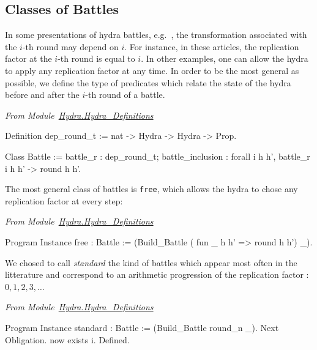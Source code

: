 \subsection{Classes of Battles}
\label{sect:battle-classes}

In some presentations of hydra battles, e.g.~\cite{KP82, bauer2008}, the transformation associated with the $i$-th round may depend on $i$. For instance, in these articles, the replication factor at the $i$-th round is equal to $i$. In other examples, one can allow the hydra to apply any replication factor at any time. In order to be the most general as possible, we define the type of predicates which relate the state of the hydra before and after the $i$-th round of a battle.

\vspace{4pt}
\emph{From Module~\href{../theories/html/hydras.Hydra.Hydra_Definitions.html}{Hydra.Hydra\_Definitions}}
\label{types:Battle}

\begin{Coqsrc}
Definition dep_round_t := nat -> Hydra -> Hydra -> Prop.

Class Battle :=  {battle_r : dep_round_t;
                  battle_inclusion : forall i h h',
                      battle_r i h h' -> round h h'}.

\end{Coqsrc}

The most general class of battles is \texttt{free}, which allows the hydra to chose any replication factor at every step:

\vspace{4pt}
\emph{From Module~\href{../theories/html/hydras.Hydra.Hydra_Definitions.html\#free}{Hydra.Hydra\_Definitions}}

\begin{Coqsrc}
Program Instance free : Battle :=
  (Build_Battle ( fun _  h h' => round h h') _).
\end{Coqsrc}

We chosed to call \emph{standard} the kind of battles which appear  most often in the litterature and correspond to an arithmetic progression of the replication factor : $0,1,2,3, \dots$

\vspace{4pt}
\emph{From Module~\href{../theories/html/hydras.Hydra.Hydra_Definitions.html\#standard}{Hydra.Hydra\_Definitions}}

\begin{Coqsrc}
Program Instance standard : Battle := (Build_Battle round_n _).
Next Obligation.
  now exists i.  
Defined.
\end{Coqsrc}


